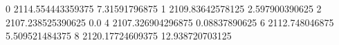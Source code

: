 0 2114.554443359375 7.31591796875
1 2109.83642578125 2.597900390625
2 2107.238525390625 0.0
4 2107.326904296875 0.08837890625
6 2112.748046875 5.509521484375
8 2120.17724609375 12.938720703125
